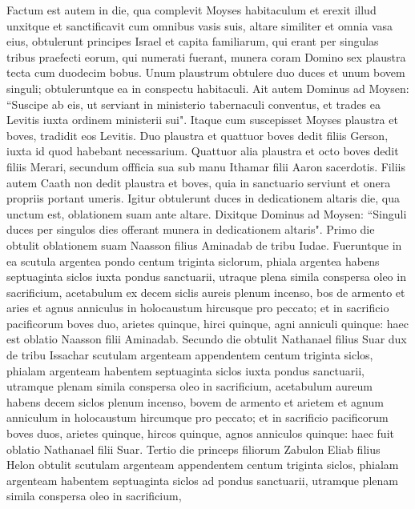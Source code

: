 \begin{biblechapter}  
\verse Factum est autem in die, qua complevit Moyses habitaculum et erexit illud unxitque et sanctificavit cum omnibus vasis suis, altare similiter et omnia vasa eius, 
\verse obtulerunt principes Israel et capita familiarum, qui erant per singulas tribus praefecti eorum, qui numerati fuerant, 
\verse munera coram Domino sex plaustra tecta cum duodecim bobus. Unum plaustrum obtulere duo duces et unum bovem singuli; obtuleruntque ea in conspectu habitaculi. 
\verse Ait autem Dominus ad Moysen: 
\verse “Suscipe ab eis, ut serviant in ministerio tabernaculi conventus, et trades ea Levitis iuxta ordinem ministerii sui". 
\verse Itaque cum suscepisset Moyses plaustra et boves, tradidit eos Levitis. 
\verse Duo plaustra et quattuor boves dedit filiis Gerson, iuxta id quod habebant necessarium. 
\verse Quattuor alia plaustra et octo boves dedit filiis Merari, secundum offficia sua sub manu Ithamar filii Aaron sacerdotis. 
\verse Filiis autem Caath non dedit plaustra et boves, quia in sanctuario serviunt et onera propriis portant umeris. 
\verse Igitur obtulerunt duces in dedicationem altaris die, qua unctum est, oblationem suam ante altare. 
\verse Dixitque Dominus ad Moysen: “Singuli duces per singulos dies offerant munera in dedicationem altaris". 
\verse Primo die obtulit oblationem suam Naasson filius Aminadab de tribu Iudae.  
\verse Fueruntque in ea scutula argentea pondo centum triginta siclorum, phiala argentea habens septuaginta siclos iuxta pondus sanctuarii, utraque plena simila conspersa oleo in sacrificium, 
\verse acetabulum ex decem siclis aureis plenum incenso, 
\verse bos de armento et aries et agnus anniculus in holocaustum 
\verse hircusque pro peccato; 
\verse et in sacrificio pacificorum boves duo, arietes quinque, hirci quinque, agni anniculi quinque: haec est oblatio Naasson filii Aminadab. 
\verse Secundo die obtulit Nathanael filius Suar dux de tribu Issachar 
\verse scutulam argenteam appendentem centum triginta siclos, phialam argenteam habentem septuaginta siclos iuxta pondus sanctuarii, utramque plenam simila conspersa oleo in sacrificium, 
\verse acetabulum aureum habens decem siclos plenum incenso, 
\verse bovem de armento et arietem et agnum anniculum in holocaustum 
\verse hircumque pro peccato; 
\verse et in sacrificio pacificorum boves duos, arietes quinque, hircos quinque, agnos anniculos quinque: haec fuit oblatio Nathanael filii Suar. 
\verse Tertio die princeps filiorum Zabulon Eliab filius Helon 
\verse obtulit scutulam argenteam appendentem centum triginta siclos, phialam argenteam habentem septuaginta siclos ad pondus sanctuarii, utramque plenam simila conspersa oleo in sacrificium, 

\end{biblechapter}
